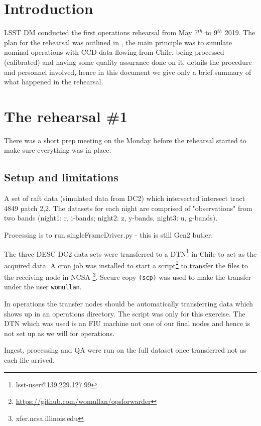 \section{Introduction} \label{sec:intro}

LSST \gls{DM} conducted the first operations rehearsal from May 7$^{th}$ to 9$^{th}$ 2019.
The plan for the rehearsal was outlined in , the main principle was to simulate
nominal operations with \gls{CCD} data flowing from Chile, being processed (calibrated) and having some quality
assurance done on it.
 details the procedure and personnel involved,
hence in this document  we give only a brief summary of what  happened in the rehearsal.


\section{The rehearsal \#1}

There was a short prep meeting on the Monday before the rehearsal started to make sure everything was in place.
\subsection{Setup and limitations} \label{sec:setup}

A set of raft data (simulated data from DC2) which intersected
intersect \gls{tract} 4849 \gls{patch} 2,2.  The datasets for each night are comprised
of "observations" from two bands (night1: r, i-bands;  night2: z, y-bands, night3: u, g-bands).

Processing is to run singleFrameDriver.py - this is still Gen2 butler.

The three \gls{DESC} DC2 data sets were transferred to a \gls{DTN}\footnote{lsst-user@139.229.127.99} in Chile to act as the acquired data.
A cron job was installed to start a script\footnote{\url{https://github.com/womullan/opsforwarder}} to transfer the files to the receiving node in \gls{NCSA} \footnote{xfer.ncsa.illinois.edu}. Secure copy \texttt{(scp)}  was used to make the transfer under the user \texttt{womullan}.

In operations the transfer nodes should be automatically transferring data which shows up in an operations directory. The script was only for this exercise. The \gls{DTN} which was used is an \gls{FIU} machine not one of our final nodes and hence is not set up as we will for operations.

Ingest, processing and \gls{QA} were run on the full dataset once transferred not as each file arrived.

